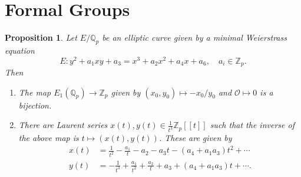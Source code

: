\documentclass[a4paper]{article}
\newtheorem{proposition}[theorem]{Proposition}
\theoremstyle{definition}
\newcommand{\series}[2]{#1[\![#2]\!]}
\renewcommand{\O}{\mathcal{O}}
\newcommand{\Z}{\mathbb{Z}}
\newcommand{\Q}{\mathbb{Q}}
\begin{document}
\section{Formal Groups}

\begin{proposition}
    Let $E/\Q_p$ be an elliptic curve given by a minimal Weierstrass equation
    \begin{equation*}
        E:y^2+a_1xy+a_3=x^3+a_2x^2+a_4x+a_6,\quad a_i\in\Z_p.
    \end{equation*}
    Then
    \begin{enumerate}[label=(\roman*)]
        \item The map $E_1(\Q_p)\to\Z_p$ given by $(x_0,y_0)\mapsto-x_0/y_0$ and
            $\O\mapsto0$ is a bijection.

    \item There are Laurent series $x(t),y(t)\in\frac{1}{t^3}\series{\Z_p}{t}$
        such that the inverse of the above map is $t\mapsto(x(t),y(t))$. These
        are given by
        \begin{align*}
            x(t) &= \frac{1}{t^2} - \frac{a_1}{t} - a_2 - a_3t - (a_4+a_1a_3)t^2
                + \cdots \\
            y(t) &= -\frac{1}{t^3} + \frac{a_1}{t^2} + \frac{a_2}{t} + a_3
                + (a_4+a_1a_3)t + \cdots.
        \end{align*}
    \end{enumerate}
\end{proposition}
\end{document}
